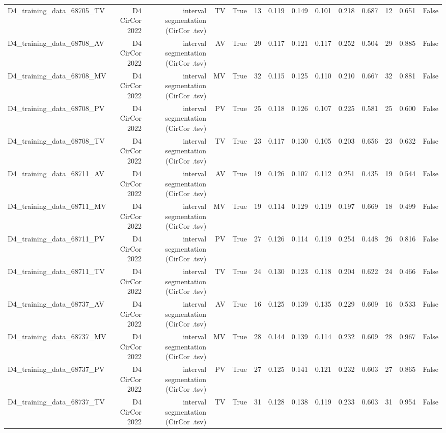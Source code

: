 \begin{table}[htbp]
\begin{tabular}{lrrrrrrrrrrrrr}
    D4\_training\_data\_68705\_TV & D4 CirCor 2022 & interval segmentation (CirCor .tsv) & TV & True & 13 & 0.119 & 0.149 & 0.101 & 0.218 & 0.687 & 12 & 0.651 & False \\
    D4\_training\_data\_68708\_AV & D4 CirCor 2022 & interval segmentation (CirCor .tsv) & AV & True & 29 & 0.117 & 0.121 & 0.117 & 0.252 & 0.504 & 29 & 0.885 & False \\
    D4\_training\_data\_68708\_MV & D4 CirCor 2022 & interval segmentation (CirCor .tsv) & MV & True & 32 & 0.115 & 0.125 & 0.110 & 0.210 & 0.667 & 32 & 0.881 & False \\
    D4\_training\_data\_68708\_PV & D4 CirCor 2022 & interval segmentation (CirCor .tsv) & PV & True & 25 & 0.118 & 0.126 & 0.107 & 0.225 & 0.581 & 25 & 0.600 & False \\
    D4\_training\_data\_68708\_TV & D4 CirCor 2022 & interval segmentation (CirCor .tsv) & TV & True & 23 & 0.117 & 0.130 & 0.105 & 0.203 & 0.656 & 23 & 0.632 & False \\
    D4\_training\_data\_68711\_AV & D4 CirCor 2022 & interval segmentation (CirCor .tsv) & AV & True & 19 & 0.126 & 0.107 & 0.112 & 0.251 & 0.435 & 19 & 0.544 & False \\
    D4\_training\_data\_68711\_MV & D4 CirCor 2022 & interval segmentation (CirCor .tsv) & MV & True & 19 & 0.114 & 0.129 & 0.119 & 0.197 & 0.669 & 18 & 0.499 & False \\
    D4\_training\_data\_68711\_PV & D4 CirCor 2022 & interval segmentation (CirCor .tsv) & PV & True & 27 & 0.126 & 0.114 & 0.119 & 0.254 & 0.448 & 26 & 0.816 & False \\
    D4\_training\_data\_68711\_TV & D4 CirCor 2022 & interval segmentation (CirCor .tsv) & TV & True & 24 & 0.130 & 0.123 & 0.118 & 0.204 & 0.622 & 24 & 0.466 & False \\
    D4\_training\_data\_68737\_AV & D4 CirCor 2022 & interval segmentation (CirCor .tsv) & AV & True & 16 & 0.125 & 0.139 & 0.135 & 0.229 & 0.609 & 16 & 0.533 & False \\
    D4\_training\_data\_68737\_MV & D4 CirCor 2022 & interval segmentation (CirCor .tsv) & MV & True & 28 & 0.144 & 0.139 & 0.114 & 0.232 & 0.609 & 28 & 0.967 & False \\
    D4\_training\_data\_68737\_PV & D4 CirCor 2022 & interval segmentation (CirCor .tsv) & PV & True & 27 & 0.125 & 0.141 & 0.121 & 0.232 & 0.603 & 27 & 0.865 & False \\
    D4\_training\_data\_68737\_TV & D4 CirCor 2022 & interval segmentation (CirCor .tsv) & TV & True & 31 & 0.128 & 0.138 & 0.119 & 0.233 & 0.603 & 31 & 0.954 & False \\

\end{tabular}
\end{table}
